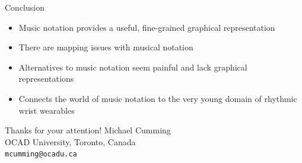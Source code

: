 \documentclass[handout]{beamer}
\begin{document}
\begin{frame}{Conclusion}
\begin{itemize}
\item Music notation provides a useful, fine-grained graphical representation
\item There are mapping issues with musical notation 
\item Alternatives to music notation seem painful and lack graphical representations
\item Connects the world of music notation to the very young domain of rhythmic wrist wearables

\end{itemize}
\end{frame}

\begin{frame}{Thanks for your attention!}
\hspace{2cm} Michael Cumming\\
\hspace{2cm} OCAD University, Toronto, Canada\\
\bigskip
 \hspace{2cm} \texttt{mcumming@ocadu.ca}
 

    
\end{frame}
\end{document}

